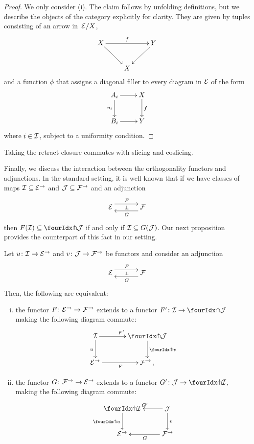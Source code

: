\documentclass[reqno,10pt,a4paper,oneside]{amsart}
\begin{document}
\begin{proof} We only consider (i). The claim follows by unfolding definitions, but we describe the objects of the category explicitly for clarity. They are given by 
tuples consisting of an arrow in~$\cal{E}/X$, 
\[
\xymatrix{
X \ar[dr] \ar[rr]^f  &  & Y \ar[dl] \\
 & X & }
 \]
and a function $\phi$ that assigns a diagonal filler to every diagram in $\cal{E}$ of the form
\[
\xymatrix{
A_i \ar[r] \ar[d]_{u_i} & X \ar[d]^{f} \\
B_i \ar[r] & Y}
\]
where $i \in \cal{I}$, subject to a uniformity condition. 
\end{proof}



\begin{remark}
\label{retract-closure-slicing}
Taking the retract closure commutes with slicing and coslicing.
\end{remark}


Finally, we discuss the interaction between the orthogonality functors and adjunctions. In the standard setting, 
it is well known that if  we have classes of maps $\cal{I} \subseteq \cal{E}^\to$ and $\cal{J} \subseteq \cal{F}^\to$ and an adjunction
\[
\xymatrix@C+1em{
  \cal{E}
  \ar@<5pt>[r]^{F}
  \ar@{}[r]|{\bot}
&
  \cal{F}
  \ar@<5pt>[l]^{G}
}
\]
then $F(\cal{I}) \subseteq \liftl{\cal{J}}$ if and only if $\cal{I} \subseteq G(\cal{J})$. Our next proposition provides the counterpart of this fact in our setting.




\begin{proposition} \label{lift-of-adjunction} 
Let $u \co \cal{I} \to \cal{E}^{\to}$ and $v \co \cal{J} \to \cal{F}^{\to}$ be functors and consider an adjunction
\[
\xymatrix@C+1em{
  \cal{E}
  \ar@<5pt>[r]^{F}
  \ar@{}[r]|{\bot}
&
  \cal{F}
  \ar@<5pt>[l]^{G}
}
\]
Then, the following are equivalent:
\begin{enumerate}[(i)] 
\item the  functor $F \co \cal{E}^\to \to \cal{F}^\to$ extends to a functor $F' \co \cal{I} \to \liftl{\cal{J}}$ making the following diagram commute:
\[
\xymatrix@C=1.2cm{
  \cal{I}
  \ar[r]^{F'}
  \ar[d]_{u}
&
  \liftl{\cal{J}}
  \ar[d]^{\liftl{v}}
\\
  \cal{E}^{\to}
  \ar[r]_-{F}
&
  \cal{F}^{\to}\, ,}
\]
\item the functor $G \co \cal{F}^\to \to \cal{E}^\to$ extends to a functor $G' \co \cal{J} \to \liftr{\cal{I}}$, making the following diagram commute:
\[
\xymatrix{
  \liftr{\cal{I}}
  \ar[d]_{\liftr{u}}
&
  \cal{J}
  \ar[l]_{G'} 
  \ar[d]^{v}
\\
  \cal{E}^{\to}
&
  \cal{F}^{\to}
  \ar[l]^{G}
}
\]
\end{enumerate}
\end{proposition}
\end{document}
